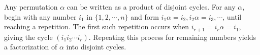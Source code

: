 Any permutation $\alpha$ can be written as a product of disjoint cycles. For any $\alpha$, begin with any number $i_1$ in $\{1, 2, \cdots, n\}$ and form $i_1\alpha = i_2, i_2\alpha = i_3, \cdots$, until reaching a repetition. The first such repetition occurs when $i_{r+1} = i_r\alpha = i_1$, giving the cycle $(i_1 i_2 \cdots i_r)$. Repeating this process for remaining numbers yields a factorization of $\alpha$ into disjoint cycles.

